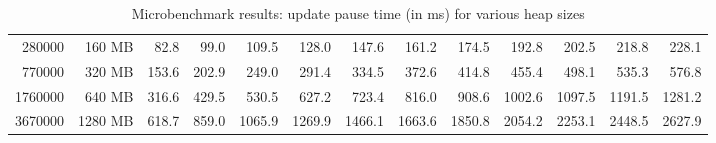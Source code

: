 \begin{table*}[t]
\begin{footnotesize}
\begin{center}
\begin{tabular}{|r|r|rrrrrrrrrrr|}
 280000 &  160 MB &    82.8 &    99.0 &   109.5 &   128.0 &   147.6 &   161.2 &   174.5 &   192.8 &   202.5 &   218.8 &   228.1 \\
 770000 &  320 MB &   153.6 &   202.9 &   249.0 &   291.4 &   334.5 &   372.6 &   414.8 &   455.4 &   498.1 &   535.3 &   576.8 \\
1760000 &  640 MB &   316.6 &   429.5 &   530.5 &   627.2 &   723.4 &   816.0 &   908.6 &  1002.6 &  1097.5 &  1191.5 &  1281.2 \\
3670000 & 1280 MB &   618.7 &   859.0 &  1065.9 &  1269.9 &  1466.1 &  1663.6 &  1850.8 &  2054.2 &  2253.1 &  2448.5 &  2627.9 \\ \hline
\end{tabular}
\end{center}
\end{footnotesize}
\caption{Microbenchmark results: \DSU{} update pause time (in ms) for various heap sizes}
\label{tab:microbench}
\end{table*}
